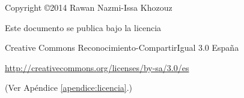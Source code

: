 \begin{flushright}
Copyright \copyright 2014 Rawan Nazmi-Issa Khozouz\\
\end{flushright}

\begin{flushright}
Este documento se publica bajo la licencia\\
\end{flushright}

\begin{flushright}
Creative Commons Reconocimiento-CompartirIgual 3.0 Espa\~na\\
\end{flushright}

\begin{flushright}
\url{http://creativecommons.org/licenses/by-sa/3.0/es}\\
\end{flushright}

\begin{flushright}
(Ver Ap\'endice \ref{apendice:licencia}.)
\end{flushright}
